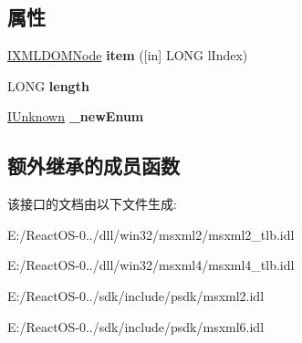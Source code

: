 \subsection*{属性}
\begin{DoxyCompactItemize}
\item 
\mbox{\label{interface_m_s_x_m_l2_1_1_i_x_m_l_d_o_m_named_node_map_aebda624e75e12db40d665389106a60ae}} 
\hyperlink{interface_m_s_x_m_l2_1_1_i_x_m_l_d_o_m_node}{I\+X\+M\+L\+D\+O\+M\+Node} {\bfseries item} (\mbox{[}in\mbox{]} L\+O\+NG l\+Index)
\item 
\mbox{\label{interface_m_s_x_m_l2_1_1_i_x_m_l_d_o_m_named_node_map_a0d94f095301b5a3012ca63aefd153386}} 
L\+O\+NG {\bfseries length}
\item 
\mbox{\label{interface_m_s_x_m_l2_1_1_i_x_m_l_d_o_m_named_node_map_a58d0dba70f9aa7fa5a81f812acb323aa}} 
\hyperlink{interface_i_unknown}{I\+Unknown} {\bfseries \+\_\+new\+Enum}
\end{DoxyCompactItemize}
\subsection*{额外继承的成员函数}


该接口的文档由以下文件生成\+:\begin{DoxyCompactItemize}
\item 
E\+:/\+React\+O\+S-\/0../dll/win32/msxml2/msxml2\+\_\+tlb.\+idl\item 
E\+:/\+React\+O\+S-\/0../dll/win32/msxml4/msxml4\+\_\+tlb.\+idl\item 
E\+:/\+React\+O\+S-\/0../sdk/include/psdk/msxml2.\+idl\item 
E\+:/\+React\+O\+S-\/0../sdk/include/psdk/msxml6.\+idl\end{DoxyCompactItemize}
